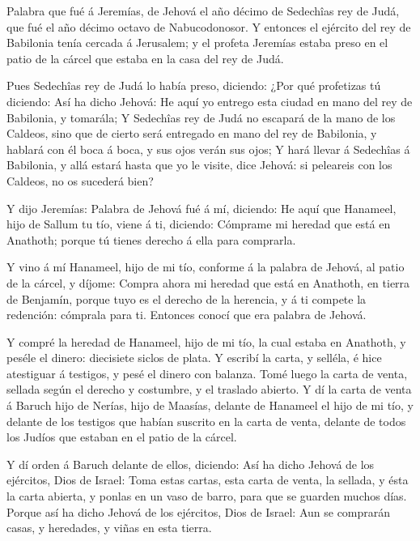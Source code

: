  Palabra que fué á Jeremías, de Jehová el año décimo de
Sedechîas rey de Judá, que fué el año décimo octavo de Nabucodonosor.
 Y entonces el ejército del rey de Babilonia tenía cercada á
Jerusalem; y el profeta Jeremías estaba preso en el patio de la cárcel
que estaba en la casa del rey de Judá.

 Pues Sedechîas rey de Judá lo había preso, diciendo: ¿Por
qué profetizas tú diciendo: Así ha dicho Jehová: He aquí yo entrego esta
ciudad en mano del rey de Babilonia, y tomarála;  Y
Sedechîas rey de Judá no escapará de la mano de los Caldeos, sino que de
cierto será entregado en mano del rey de Babilonia, y hablará con él
boca á boca, y sus ojos verán sus ojos;  Y hará llevar á
Sedechîas á Babilonia, y allá estará hasta que yo le visite, dice
Jehová: si peleareis con los Caldeos, no os sucederá bien?

 Y dijo Jeremías: Palabra de Jehová fué á mí, diciendo:
 He aquí que Hanameel, hijo de Sallum tu tío, viene á ti,
diciendo: Cómprame mi heredad que está en Anathoth; porque tú tienes
derecho á ella para comprarla.

 Y vino á mí Hanameel, hijo de mi tío, conforme á la palabra
de Jehová, al patio de la cárcel, y díjome: Compra ahora mi heredad que
está en Anathoth, en tierra de Benjamín, porque tuyo es el derecho de la
herencia, y á ti compete la redención: cómprala para ti. Entonces conocí
que era palabra de Jehová.

 Y compré la heredad de Hanameel, hijo de mi tío, la cual
estaba en Anathoth, y peséle el dinero: diecisiete siclos de plata.
 Y escribí la carta, y selléla, é hice atestiguar á
testigos, y pesé el dinero con balanza.  Tomé luego la
carta de venta, sellada según el derecho y costumbre, y el traslado
abierto.  Y dí la carta de venta á Baruch hijo de Nerías,
hijo de Maasías, delante de Hanameel el hijo de mi tío, y delante de los
testigos que habían suscrito en la carta de venta, delante de todos los
Judíos que estaban en el patio de la cárcel.

 Y dí orden á Baruch delante de ellos, diciendo:
 Así ha dicho Jehová de los ejércitos, Dios de Israel: Toma
estas cartas, esta carta de venta, la sellada, y ésta la carta abierta,
y ponlas en un vaso de barro, para que se guarden muchos días.
 Porque así ha dicho Jehová de los ejércitos, Dios de
Israel: Aun se comprarán casas, y heredades, y viñas en esta tierra.

